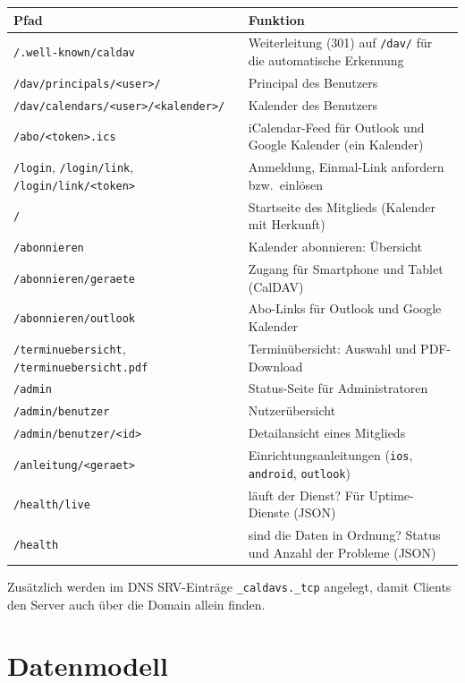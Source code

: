 \documentclass[a4paper,fontsize=10pt]{scrartcl}
\newcommand{\code}[1]{\texttt{#1}}
\begin{document}
\begin{center}
\begin{tabularx}{\textwidth}{L{6.9cm}X}
\toprule
\textbf{Pfad} & \textbf{Funktion} \\
\midrule
\code{/.well-known/caldav} & Weiterleitung (301) auf \code{/dav/} für die
                             automatische Erkennung \\
\code{/dav/principals/<user>/} & Principal des Benutzers \\
\code{/dav/calendars/<user>/<kalender>/} & Kalender des Benutzers \\
\code{/abo/<token>.ics} & iCalendar-Feed für Outlook und Google Kalender
                          (ein Kalender) \\
\code{/login}, \code{/login/link}, \code{/login/link/<token>} & Anmeldung,
                          Einmal-Link anfordern bzw.\ einlösen \\
\code{/} & Startseite des Mitglieds (Kalender mit Herkunft) \\
\code{/abonnieren} & Kalender abonnieren: Übersicht \\
\code{/abonnieren/geraete} & Zugang für Smartphone und Tablet (CalDAV) \\
\code{/abonnieren/outlook} & Abo-Links für Outlook und Google Kalender \\
\code{/terminuebersicht}, \code{/terminuebersicht.pdf} & Terminübersicht:
                          Auswahl und PDF-Download \\
\code{/admin} & Status-Seite für Administratoren \\
\code{/admin/benutzer} & Nutzerübersicht \\
\code{/admin/benutzer/<id>} & Detailansicht eines Mitglieds \\
\code{/anleitung/<geraet>} & Einrichtungsanleitungen (\code{ios}, \code{android}, \code{outlook}) \\
\code{/health/live} & läuft der Dienst? Für Uptime-Dienste (JSON) \\
\code{/health} & sind die Daten in Ordnung? Status und Anzahl der Probleme (JSON) \\
\bottomrule
\end{tabularx}
\end{center}

Zusätzlich werden im DNS SRV-Einträge \code{\_caldavs.\_tcp} angelegt, damit
Clients den Server auch über die Domain allein finden.

\section{Datenmodell}
\end{document}
